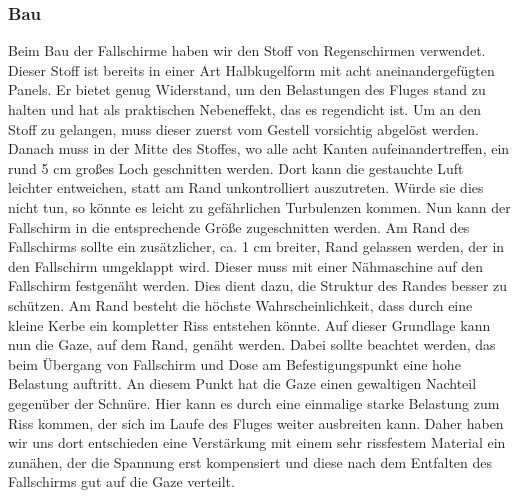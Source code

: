 \subsubsection{Bau}
Beim Bau der Fallschirme haben wir den Stoff von Regenschirmen verwendet. Dieser Stoff ist bereits in einer Art Halbkugelform mit acht aneinandergefügten Panels. Er bietet genug Widerstand, um den Belastungen des Fluges stand zu halten und hat als praktischen Nebeneffekt, das es regendicht ist. Um an den Stoff zu gelangen, muss dieser zuerst vom Gestell vorsichtig abgelöst werden. Danach muss in der Mitte des Stoffes, wo alle acht Kanten aufeinandertreffen, ein rund 5 cm großes Loch geschnitten werden. Dort kann die gestauchte Luft leichter entweichen, statt am Rand unkontrolliert auszutreten. Würde sie dies nicht tun, so könnte es leicht zu gefährlichen Turbulenzen kommen. Nun kann der Fallschirm in die entsprechende Größe zugeschnitten werden. Am Rand des Fallschirms sollte ein zusätzlicher, ca. 1 cm breiter, Rand gelassen werden, der in den Fallschirm umgeklappt wird. Dieser muss mit einer Nähmaschine auf den Fallschirm festgenäht werden. Dies dient dazu, die Struktur des Randes besser zu schützen. Am Rand besteht die höchste Wahrscheinlichkeit, dass durch eine kleine Kerbe ein kompletter Riss entstehen könnte. Auf dieser Grundlage kann nun die Gaze, auf dem Rand, genäht werden. Dabei sollte beachtet werden, das beim Übergang von Fallschirm und Dose am Befestigungspunkt eine hohe Belastung auftritt. An diesem Punkt hat die Gaze einen gewaltigen Nachteil gegenüber der Schnüre. Hier kann es durch eine einmalige starke Belastung zum Riss kommen, der sich im Laufe des Fluges weiter ausbreiten kann. Daher haben wir uns dort entschieden eine Verstärkung mit einem sehr rissfestem Material ein zunähen, der die Spannung erst kompensiert und diese nach dem Entfalten des Fallschirms gut auf die Gaze verteilt.